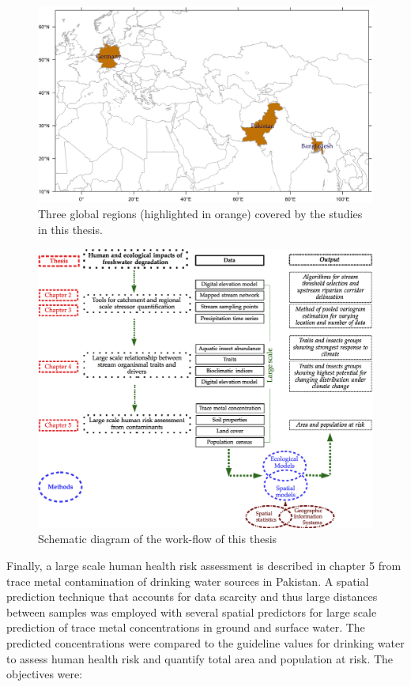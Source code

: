 \vspace{-0.5cm}\noindent\begin{figure}[h!]
  \centering
  \includegraphics[width=\linewidth]{Figures/Fig_1_2.png}
  \caption{Three global regions (highlighted in orange) covered by the studies in this thesis.}
  \label{Fig_1_2}
\end{figure}

\clearpage

\noindent\begin{figure}[h!]
  \centering
  \includegraphics[width=\linewidth]{Figures/Fig_1_3.png}
  \caption{Schematic diagram of the work-flow of this thesis}
  \label{Fig_1_3}
\end{figure}

Finally, a large scale human health risk assessment is described in chapter 5 from trace metal contamination of drinking water sources in Pakistan. A spatial prediction technique that accounts for data scarcity and thus large distances between samples was employed with several spatial predictors for large scale prediction of trace metal concentrations in ground and surface water. The predicted concentrations were compared to the guideline values for drinking water to assess human health risk and quantify total area and population at risk. The objectives were:

